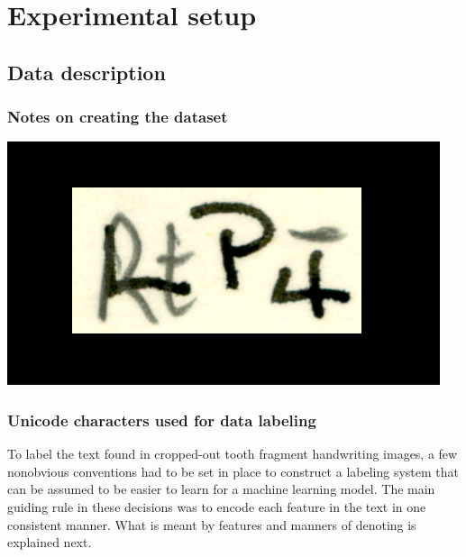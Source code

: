 \documentclass{article}
\begin{document}
\section{Experimental setup}

\subsection{Data description}

\subsubsection{Notes on creating the dataset}

\includegraphics*[scale=0.2]{../images/superambiguous_data_sample.png}

\subsubsection{Unicode characters used for data labeling}

To label the text found in cropped-out tooth fragment handwriting images, a few nonobvious 
conventions had to be set in place to construct a labeling system that can be assumed to 
be easier to learn for a machine learning model. The main guiding rule in these decisions was 
to encode each feature in the text in one consistent manner. What is meant by features and manners 
of denoting is explained next.
\end{document}
